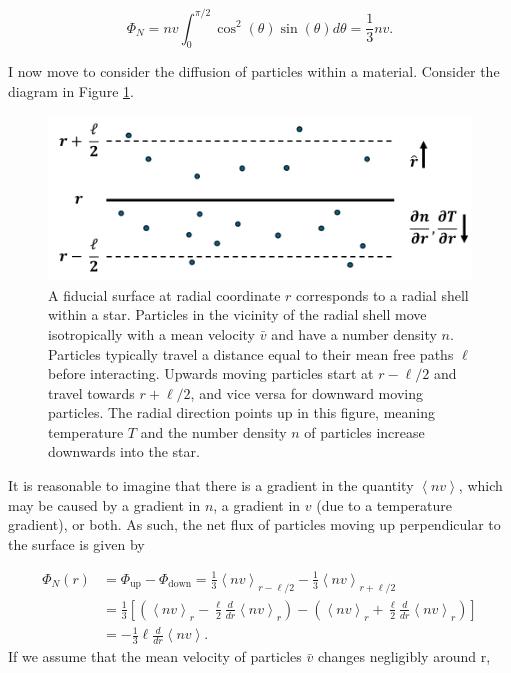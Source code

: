 \documentclass[12pt]{article}
\newcommand{\deriv}[2]{\frac{d #1}{d #2}}
\begin{document}
\begin{equation}
    \Phi_N = nv \int_0^{\pi/2} \cos^2(\theta) \sin(\theta) d\theta = \frac{1}{3} nv.
\end{equation}

I now move to consider the diffusion of particles within a material. Consider the diagram in Figure \ref{fig:diffusion_mfp}.

\begin{figure}[H]
    \centering
    \includegraphics[width=0.5\linewidth]{Appendices//Rad Transport/diffusion2.png}
    \caption{A fiducial surface at radial coordinate $r$ corresponds to a radial shell within a star. Particles in the vicinity of the radial shell move isotropically with a mean velocity $\bar{v}$ and have a number density $n$. Particles typically travel a distance equal to their mean free paths $\ell$ before interacting. Upwards moving particles start at $r - \ell/2$ and travel towards $r + \ell/2$, and vice versa for downward moving particles. The radial direction points up in this figure, meaning temperature $T$ and the number density $n$ of particles increase downwards into the star.}
    \label{fig:diffusion_mfp}
\end{figure}

It is reasonable to imagine that there is a gradient in the quantity $\left<nv\right>$, which may be caused by a gradient in $n$, a gradient in $v$ (due to a temperature gradient), or both. As such, the net flux of particles moving up perpendicular to the surface is given by

\begin{align}
    \Phi_N(r) &= \Phi_\mathrm{up} - \Phi_\mathrm{down} = \frac{1}{3}\left<nv\right>_{r - \ell/2} - \frac{1}{3}\left<nv\right>_{r + \ell/2} \\
    &= \frac{1}{3}\left[\left(\left<nv\right>_r - \frac{\ell}{2}\deriv{}{r}\left<nv\right>_r \right) - \left(\left<nv\right>_r + \frac{\ell}{2}\deriv{}{r}\left<nv\right>_r \right)  \right] \\
    &= -\frac{1}{3}\ell \deriv{}{r}\left<nv\right>.
\end{align}
%
If we assume that the mean velocity of particles $\bar{v}$ changes negligibly around r, 
\end{document}
